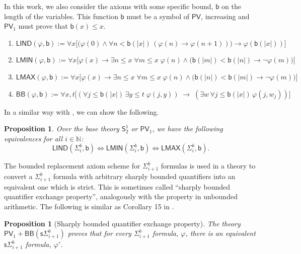 \documentclass[11pt]{article}
\newcommand{\N}{\mathbb{N}}
\newcommand{\PV}{\mathsf{PV}}
\newcommand{\SOT}{\mathsf{S}^1_2}
\newcommand{\bd}{\mathsf{b}}
\newcommand{\abs}[1]{\lvert #1 \rvert}
\newtheorem{proposition}[theorem]{Proposition}
\theoremstyle{definition}
\theoremstyle{definition}
\theoremstyle{remark}
\begin{document}
In this work, we also consider the axioms with some specific bound, $\bd$ on the length of the variables. This function $\bd$ must be a symbol of $\PV$, increasing and  $\PV_1$ must prove that $\bd(x)\leq x$.

\begin{enumerate}
    \item $\mathsf{LIND}(\varphi,\bd):= \forall x \Big[\big(\varphi(0) \land \forall n < \bd( |x|)\, (\varphi(n)\rightarrow \varphi(n+1))\big) \rightarrow \varphi(\bd(|x|))\Big]$
    \item $\mathsf{LMIN}(\varphi,\bd):= \forall x \Big[\varphi (x) \rightarrow \exists n\leq x\;\forall m\leq x\;\varphi(n) \land \big(\bd(\abs{m})<\bd(\abs{n}) \rightarrow \neg \varphi(m) \big)\Big]$
    \item $\mathsf{LMAX}(\varphi,\bd):=\forall x \Big[\varphi (x) \rightarrow \exists n\leq x\;\forall m\leq x\;\varphi(n) \land \big(\bd(\abs{n})<\bd(\abs{m} )\rightarrow \neg \varphi(m) \big)\Big]$
    \item $\mathsf{BB}(\varphi,\bd):=  \forall x,t \Big[(\forall j \leq \bd(|x|) \, \exists y \leq t \; \varphi(j,y))\;\rightarrow\;(\exists w \, \forall j \leq \bd(|x| )\, \varphi(j, w_j)) \Big]$
\end{enumerate}

In a similar way with , we can show the following.

\begin{proposition}\label{prop:lind}
    Over the base theory $\SOT$ or $\PV_1$, we have the following equivalences for all $i\in \N$:
$$\mathsf{LIND}(\Sigma^b_i,\bd)  \iff \mathsf{LMIN}(\Sigma^b_i,\bd) \iff \mathsf{LMAX}(\Sigma^b_i,\bd).$$

\end{proposition}

The bounded replacement axiom scheme for $\Sigma^b_{i+1}$ formulas is used in a theory to convert a $\Sigma^b_{i+1}$ formula with arbitrary sharply bounded quantifiers into an equivalent one which is strict. This is sometimes called ``sharply bounded quantifier exchange property'', analogously with the property in unbounded arithmetic. The following is similar as Corollary 15 in \cite{buss1985bounded}.

\begin{proposition}[Sharply bounded quantifier exchange property]
    The theory $\PV_1+\mathsf{BB}(\mathsf{s}\Sigma^b_{i+1})$ proves that for every $\Sigma^b_{i+1}$ formula, $\varphi$, there is an equivalent $\mathsf{s}\Sigma^b_{i+1}$ formula, $\varphi'$.
\end{proposition}
\end{document}
